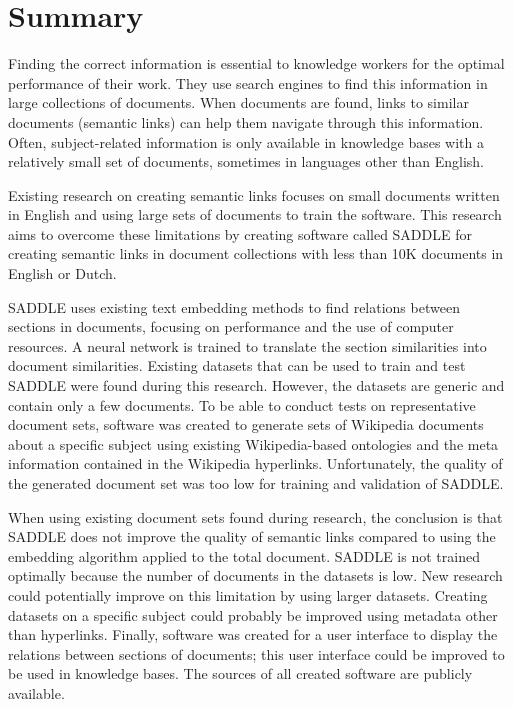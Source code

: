 \chapter{Summary}

Finding the correct information is essential to knowledge workers for the optimal performance of their work. They use search engines to find this information in large collections of documents. When documents are found, links to similar documents (semantic links) can help them navigate through this information. Often, subject-related information is only available in knowledge bases with a relatively small set of documents, sometimes in languages other than English. 

Existing research on creating semantic links focuses on small documents written in English and using large sets of documents to train the software. This research aims to overcome these limitations by creating software called SADDLE for creating semantic links in document collections with less than 10K documents in English or Dutch.

SADDLE uses existing text embedding methods to find relations between sections in documents, focusing on performance and the use of computer resources. A neural network is trained to translate the section similarities into document similarities. Existing datasets that can be used to train and test SADDLE were found during this research. However, the datasets are generic and contain only a few documents. To be able to conduct tests on representative document sets, software was created to generate sets of Wikipedia documents about a specific subject using existing Wikipedia-based ontologies and the meta information contained in the Wikipedia hyperlinks. Unfortunately, the quality of the generated document set was too low for training and validation of SADDLE.

When using existing document sets found during research, the conclusion is that SADDLE does not improve the quality of semantic links compared to using the embedding algorithm applied to the total document. SADDLE is not trained optimally because the number of documents in the datasets is low. New research could potentially improve on this limitation by using larger datasets. Creating datasets on a specific subject could probably be improved using metadata other than hyperlinks. Finally, software was created for a user interface to display the relations between sections of documents; this user interface could be improved to be used in knowledge bases. The sources of all created software are publicly available. 

